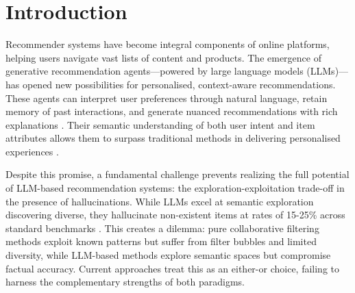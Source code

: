 \documentclass[acmsmall]{acmart}
\begin{document}

\section{Introduction}

Recommender systems have become integral components of online platforms, helping users navigate vast lists of content and products. The emergence of generative recommendation agents—powered by large language models (LLMs)—has opened new possibilities for personalised, context-aware recommendations. These agents can interpret user preferences through natural language, retain memory of past interactions, and generate nuanced recommendations with rich explanations \cite{park2024llm, kang2023conversationalrec}. Their semantic understanding of both user intent and item attributes allows them to surpass traditional methods in delivering personalised experiences \cite{baltrunas2015frappe}.

Despite this promise, a fundamental challenge prevents realizing the full potential of LLM-based recommendation systems: the exploration-exploitation trade-off in the presence of hallucinations. While LLMs excel at semantic exploration discovering diverse, they hallucinate non-existent items at rates of 15-25\% across standard benchmarks \cite{thompson2024user}. This creates a dilemma: pure collaborative filtering methods exploit known patterns but suffer from filter bubbles and limited diversity, while LLM-based methods explore semantic spaces but compromise factual accuracy. Current approaches treat this as an either-or choice, failing to harness the complementary strengths of both paradigms.
\end{document}
